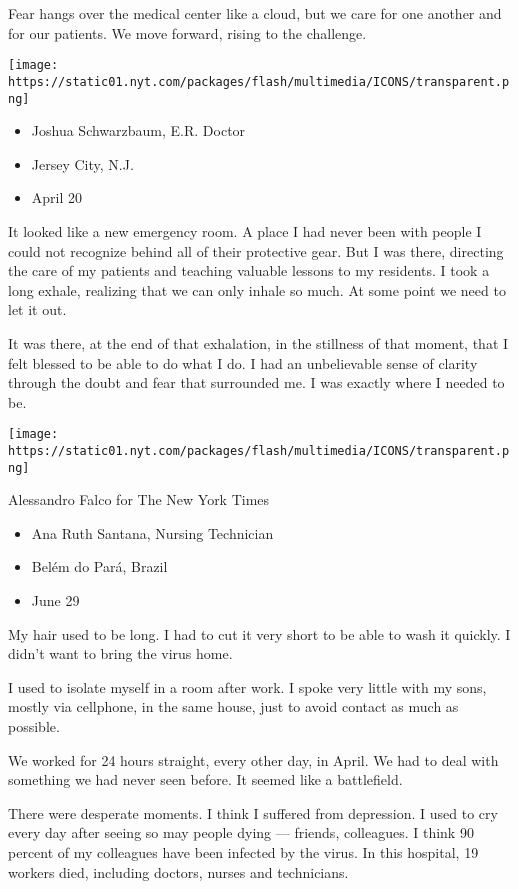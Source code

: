 Fear hangs over the medical center like a cloud, but we care for one
another and for our patients. We move forward, rising to the challenge.

\texttt{[image: https://static01.nyt.com/packages/flash/multimedia/ICONS/transparent.png]}

\begin{itemize}
\tightlist
\item
  Joshua Schwarzbaum, E.R. Doctor
\item
  Jersey City, N.J.
\item
  April 20
\end{itemize}

It looked like a new emergency room. A place I had never been with
people I could not recognize behind all of their protective gear. But I
was there, directing the care of my patients and teaching valuable
lessons to my residents. I took a long exhale, realizing that we can
only inhale so much. At some point we need to let it out.

It was there, at the end of that exhalation, in the stillness of that
moment, that I felt blessed to be able to do what I do. I had an
unbelievable sense of clarity through the doubt and fear that surrounded
me. I was exactly where I needed to be.

\texttt{[image: https://static01.nyt.com/packages/flash/multimedia/ICONS/transparent.png]}

Alessandro Falco for The New York Times

\begin{itemize}
\tightlist
\item
  Ana Ruth Santana, Nursing Technician
\item
  Belém do Pará, Brazil
\item
  June 29
\end{itemize}

My hair used to be long. I had to cut it very short to be able to wash
it quickly. I didn't want to bring the virus home.

I used to isolate myself in a room after work. I spoke very little with
my sons, mostly via cellphone, in the same house, just to avoid contact
as much as possible.

We worked for 24 hours straight, every other day, in April. We had to
deal with something we had never seen before. It seemed like a
battlefield.

There were desperate moments. I think I suffered from depression. I used
to cry every day after seeing so may people dying --- friends,
colleagues. I think 90 percent of my colleagues have been infected by
the virus. In this hospital, 19 workers died, including doctors, nurses
and technicians.

